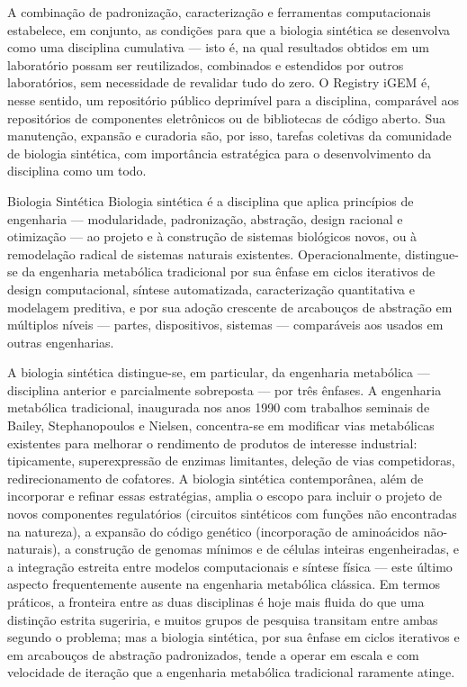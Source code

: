 A combinação de padronização, caracterização e ferramentas computacionais estabelece, em conjunto, as condições para que a biologia sintética se desenvolva como uma disciplina cumulativa --- isto é, na qual resultados obtidos em um laboratório possam ser reutilizados, combinados e estendidos por outros laboratórios, sem necessidade de revalidar tudo do zero. O Registry iGEM é, nesse sentido, um repositório público deprimível para a disciplina, comparável aos repositórios de componentes eletrônicos ou de bibliotecas de código aberto. Sua manutenção, expansão e curadoria são, por isso, tarefas coletivas da comunidade de biologia sintética, com importância estratégica para o desenvolvimento da disciplina como um todo.



\begin{definicao}{Biologia Sintética}
Biologia sintética é a disciplina que aplica princípios de engenharia --- modularidade, padronização, abstração, design racional e otimização --- ao projeto e à construção de sistemas biológicos novos, ou à remodelação radical de sistemas naturais existentes. Operacionalmente, distingue-se da engenharia metabólica tradicional por sua ênfase em ciclos iterativos de design computacional, síntese automatizada, caracterização quantitativa e modelagem preditiva, e por sua adoção crescente de arcabouços de abstração em múltiplos níveis --- partes, dispositivos, sistemas --- comparáveis aos usados em outras engenharias.
\end{definicao}

A biologia sintética distingue-se, em particular, da engenharia metabólica --- disciplina anterior e parcialmente sobreposta --- por três ênfases. A engenharia metabólica tradicional, inaugurada nos anos 1990 com trabalhos seminais de Bailey, Stephanopoulos e Nielsen, concentra-se em modificar vias metabólicas existentes para melhorar o rendimento de produtos de interesse industrial: tipicamente, superexpressão de enzimas limitantes, deleção de vias competidoras, redirecionamento de cofatores. A biologia sintética contemporânea, além de incorporar e refinar essas estratégias, amplia o escopo para incluir o projeto de novos componentes regulatórios (circuitos sintéticos com funções não encontradas na natureza), a expansão do código genético (incorporação de aminoácidos não-naturais), a construção de genomas mínimos e de células inteiras engenheiradas, e a integração estreita entre modelos computacionais e síntese física --- este último aspecto frequentemente ausente na engenharia metabólica clássica. Em termos práticos, a fronteira entre as duas disciplinas é hoje mais fluida do que uma distinção estrita sugeriria, e muitos grupos de pesquisa transitam entre ambas segundo o problema; mas a biologia sintética, por sua ênfase em ciclos iterativos e em arcabouços de abstração padronizados, tende a operar em escala e com velocidade de iteração que a engenharia metabólica tradicional raramente atinge.

